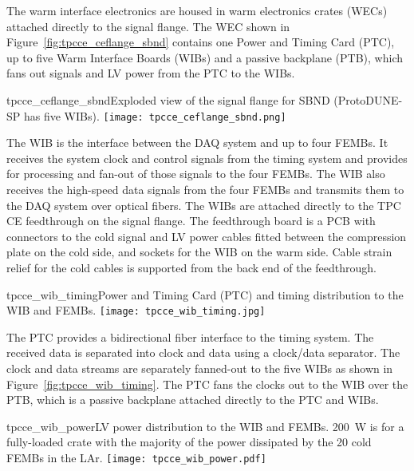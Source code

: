 The warm interface electronics are housed in warm electronics crates (WECs)
attached directly to the signal flange.  The WEC shown in Figure~\ref{fig:tpcce_ceflange_sbnd} 
contains one
Power and Timing Card (PTC), up to five Warm Interface Boards (WIBs) and a passive
backplane (PTB), which fans out signals and LV power from the PTC to the WIBs.

\begin{cdrfigure}{tpcce_ceflange_sbnd}{Exploded view of 
the signal flange for SBND (ProtoDUNE-SP has five WIBs).}
\texttt{[image: tpcce\_ceflange\_sbnd.png]}
\end{cdrfigure}

The WIB is the interface between the
DAQ system and up to four
FEMBs. It receives the system clock and control signals from the
timing system and provides for processing and fan-out of those signals to the four
FEMBs. The WIB also receives the high-speed data signals from the four 
FEMBs and transmits them to the DAQ system over optical
fibers.  The WIBs are attached directly to the TPC
CE feedthrough on the signal flange. The feedthrough
board is a PCB with connectors to the cold signal and LV power cables fitted
between the compression plate on the cold side, and sockets for
the WIB on the warm side. Cable strain relief for the cold cables is 
supported from the back end of the feedthrough.



\begin{cdrfigure}{tpcce_wib_timing}{Power and Timing Card (PTC) 
and timing distribution to the WIB and FEMBs.}
\texttt{[image: tpcce\_wib\_timing.jpg]}
\end{cdrfigure}

The PTC provides a bidirectional fiber interface to the
timing system.  The received data is separated into clock and
data using a clock/data separator.  The clock and data
streams are separately fanned-out to the five WIBs as shown in
Figure~\ref{fig:tpcce_wib_timing}. The PTC fans the clocks out to the WIB over the
PTB, which is a passive backplane attached directly to the PTC and
WIBs.

\begin{cdrfigure}{tpcce_wib_power}{LV power distribution 
to the WIB and FEMBs. 200~W is for a fully-loaded crate 
with the majority of the power dissipated by the 20 cold FEMBs in the LAr.}
\texttt{[image: tpcce\_wib\_power.pdf]}
\end{cdrfigure}

